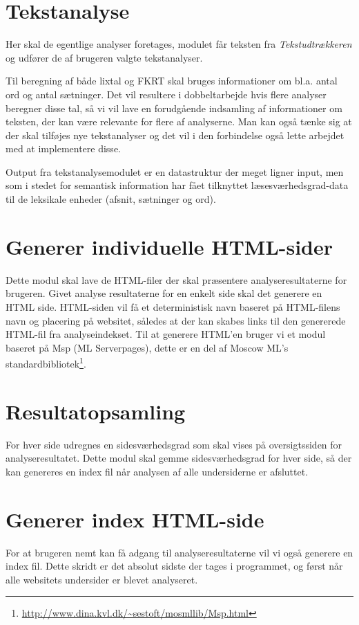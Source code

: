 \documentclass[a4paper,oneside,article, titlepage]{memoir}
\begin{document}
\section{Tekstanalyse}
Her skal de egentlige analyser foretages, modulet får teksten fra
\textit{Tekstudtrækkeren} og udfører de af brugeren valgte
tekstanalyser.

Til beregning af både lixtal og FKRT skal bruges informationer om
bl.a. antal ord og antal sætninger. Det vil resultere i dobbeltarbejde
hvis flere analyser beregner disse tal, så vi vil lave en forudgående
indsamling af informationer om teksten, der kan være relevante for
flere af analyserne. Man kan også tænke sig at der skal tilføjes nye
tekstanalyser og det vil i den forbindelse også lette arbejdet med at
implementere disse.

Output fra tekstanalysemodulet er en datastruktur der meget ligner
input, men som i stedet for semantisk information har fået tilknyttet
læsesværhedsgrad-data til de leksikale enheder (afsnit, sætninger og
ord).

\section{Generer individuelle HTML-sider}
Dette modul skal lave de HTML-filer der skal præsentere
analyseresultaterne for brugeren. Givet analyse resultaterne for en
enkelt side skal det generere en HTML side. HTML-siden vil få et
deterministisk navn baseret på HTML-filens navn og placering på
websitet, således at der kan skabes links til den genererede HTML-fil
fra analyseindekset. Til at generere HTML'en bruger vi et modul
baseret på Msp (ML Serverpages), dette er en del af Moscow ML's
standardbibliotek\footnote{\url{http://www.dina.kvl.dk/~sestoft/mosmllib/Msp.html}}.

\section{Resultatopsamling}
For hver side udregnes en sidesværhedsgrad som skal vises på
oversigtssiden for analyseresultatet. Dette modul skal gemme
sidesværhedsgrad for hver side, så der kan genereres en index fil når
analysen af alle undersiderne er afsluttet.

\section{Generer index HTML-side}
For at brugeren nemt kan få adgang til analyseresultaterne vil vi også
generere en index fil. Dette skridt er det absolut sidste der tages i
programmet, og først når alle websitets undersider er blevet
analyseret.
\end{document}
